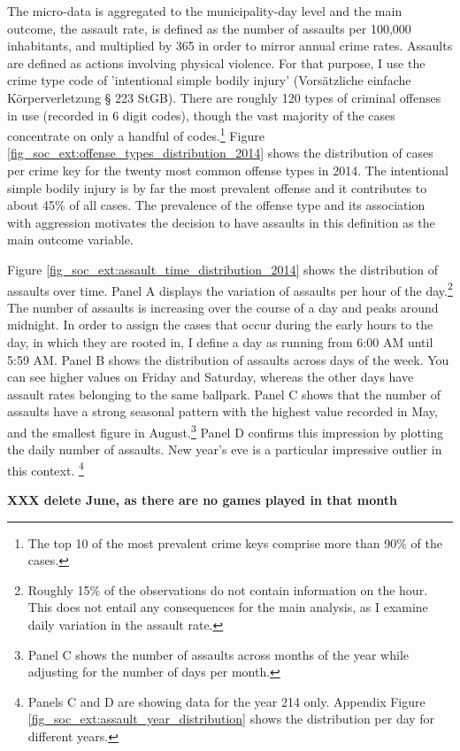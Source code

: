 \documentclass[11pt, a4paper, draft]{article} %
\begin{document}
The micro-data is aggregated to the municipality-day level and the main outcome, the assault rate, is defined as the number of assaults per 100,000 inhabitants, and multiplied by 365 in order to mirror annual crime rates. Assaults are defined as actions involving physical violence. For that purpose, I use the crime type code of 'intentional simple bodily injury' (Vorsätzliche einfache Körperverletzung § 223 StGB). There are roughly 120 types of criminal offenses in use (recorded in 6 digit codes), though the vast majority of the cases concentrate on only a handful of codes.\footnote{The top 10 of the most prevalent crime keys comprise more than 90\% of the cases.} Figure \ref{fig_soc_ext:offense_types_distribution_2014} shows the distribution of cases per crime key for the twenty most common offense types in 2014. The intentional simple bodily injury is by far the most prevalent offense and it contributes to about 45\% of all cases. The prevalence of the offense type and its association with aggression motivates the decision to have assaults in this definition as the main outcome variable.

Figure \ref{fig_soc_ext:assault_time_distribution_2014} shows the distribution of assaults over time. Panel A displays the variation of assaults per hour of the day.\footnote{Roughly 15\% of the observations do not contain information on the hour. This does not entail any consequences for the main analysis, as I examine daily variation in the assault rate.} The number of assaults is increasing over the course of a day and peaks around midnight. In order to assign the cases that occur during the early hours to the day, in which they are rooted in, I define a day as running from 6:00 AM until 5:59 AM. Panel B shows the distribution of assaults across days of the week. You can see higher values on Friday and Saturday, whereas the other days have assault rates belonging to the same ballpark. Panel C shows that the number of assaults have a strong seasonal pattern with the highest value recorded in May, and the smallest figure in August.\footnote{Panel C shows the number of assaults across months of the year while adjusting for the number of days per month.} Panel D confirms this impression by plotting the daily number of assaults. New year's eve is a particular impressive outlier in this context. \footnote{Panels C and D are showing data for the year 214 only. Appendix Figure  \ref{fig_soc_ext:assault_year_distribution} shows the distribution per day for different years.}

\textbf{XXX delete June, as there are no games played in that month}
\end{document}
